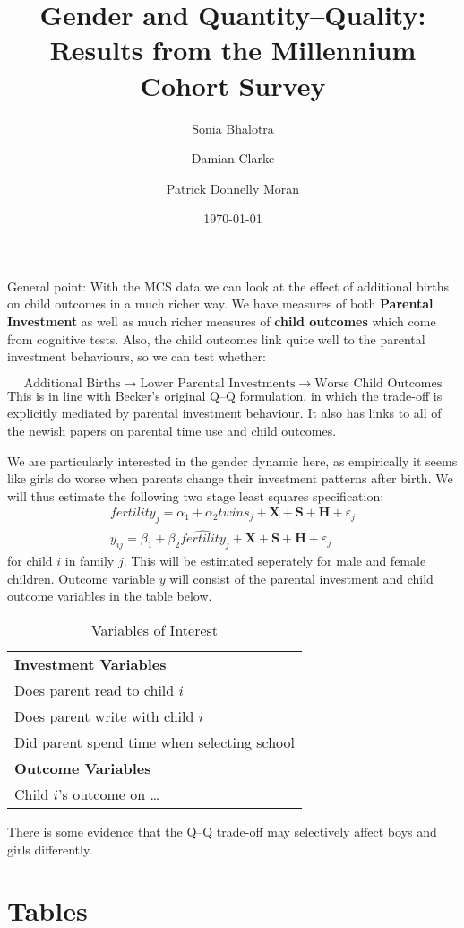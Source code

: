 \documentclass[a4paper, 11pt]{article}
\title{Gender and Quantity--Quality: Results from the Millennium Cohort Survey}
\author{Sonia Bhalotra \and Damian Clarke \and Patrick Donnelly Moran}
\date{\today}
\theoremstyle{plain}
\begin{document}
\sffamily
\maketitle

General point: With the MCS data we can look at the effect of additional births
on child outcomes in a much richer way.  We have measures of both
\textbf{Parental Investment} as well as much richer measures of
\textbf{child outcomes} which come from cognitive tests.  Also, the child
outcomes link quite well to the parental investment behaviours, so we can
test whether:

\[
\text{Additional Births}\rightarrow\text{Lower Parental Investments}\rightarrow\text{Worse Child Outcomes}
\]
This is in line with Becker's original Q--Q formulation, in which the
trade-off is explicitly mediated by parental investment behaviour.  It also
has links to all of the newish papers on parental time use and child outcomes.

We are particularly interested in the gender dynamic here, as empirically it
seems like girls do worse when parents change their investment patterns after
birth.  We will thus estimate the following two stage least squares specification:
\begin{eqnarray}
  fertility_j = \alpha_1 + \alpha_2 twins_j + \bm{X} + \bm{S} + \bm{H} + \varepsilon_j \\
  y_{ij} = \beta_1 + \beta_2 \widehat{fertility}_j + \bm{X} + \bm{S} + \bm{H} + \varepsilon_j 
\end{eqnarray}
for child $i$ in family $j$.  This will be estimated seperately for male and female children.
Outcome variable $y$ will consist of the parental investment and child outcome variables in
the table below.
\begin{table}[htpb!]
\caption{Variables of Interest}
  \begin{tabular}{l} \toprule
  \textbf{Investment Variables}  \\
  Does parent read to child $i$  \\
  Does parent write with child $i$  \\
  Did parent spend time when selecting school  \\
  \textbf{Outcome Variables}  \\
  Child $i$'s outcome on \ldots \\
  \bottomrule
  \end{tabular}
\end{table}

There is some evidence that the Q--Q trade-off may selectively affect boys and girls
differently.  \citet{Juhnetal2015}

\clearpage

\section{Tables}
\begin{landscape}
	
\end{landscape}

\clearpage

\begin{landscape}
	
\end{landscape}

\clearpage

\end{document}
